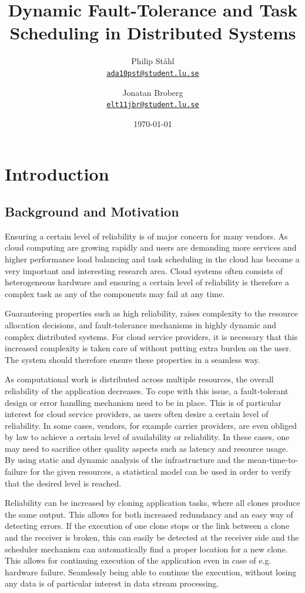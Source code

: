 \documentclass{cslthse-msc}
\author{
	Philip Ståhl \\
	{\normalsize \href{mailto:ada10pst@student.lu.se}{\texttt{ada10pst@student.lu.se}}}
	\and
	Jonatan Broberg \\
    {\normalsize \href{mailto:elt11jbr@student.lu.se
}{\texttt{elt11jbr@student.lu.se}}}
}
\title{Dynamic Fault-Tolerance and Task Scheduling in Distributed Systems}
\subtitle{}
\date{\today}
\begin{document}
\makefrontmatter

\chapter{Introduction} \label{ch:introduction} 
\section{Background and Motivation} 
Ensuring a certain level of reliability is of major concern for many vendors. As cloud computing are growing rapidly and users are demanding more services and higher performance load balancing and task scheduling in the cloud has become a very important and interesting research area. 
Cloud systems often consists of heterogeneous hardware and  ensuring a certain level of reliability is therefore a complex task as any of the components may fail at any time. 

Guaranteeing properties such as high reliability, raises complexity to the resource allocation decisions, and fault-tolerance mechanisms in highly dynamic and complex distributed systems. For cloud service providers, it is necessary that this increased complexity is taken care of without putting extra burden on the user. The system should therefore ensure these properties in a seamless way.

As computational work is distributed across multiple resources, the overall reliability of the application decreases. To cope with this issue, a fault-tolerant design or error handling mechanism need to be in place. This is of particular interest for cloud service providers, as users often desire a certain level of reliability. In some cases, vendors, for example carrier providers, are even obliged by law to achieve a certain level of availability or reliability. In these cases, one may need to sacrifice other quality aspects such as latency and resource usage. By using static and dynamic analysis of the infrastructure and the mean-time-to-failure for the given resources, a statistical model can be used in order to verify  that the desired level is reached.

Reliability can be increased by cloning application tasks, where all clones produce the same output. This allows for both increased redundancy and an easy way of detecting errors. If the execution of one clone stops or the link between a clone and the receiver is broken, this can easily be detected at the receiver side and the scheduler mechanism can automatically find a proper location for a new clone. This allows for continuing execution of the application even in case of e.g. hardware failure. Seamlessly being able to continue the execution, without losing any data is of particular interest in data stream processing.
\end{document}
